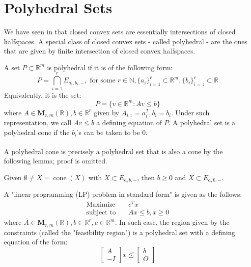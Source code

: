 \section{Polyhedral Sets}
\label{sect:017}

\paragraph{}We have seen in  that closed convex sets are essentially intersections of closed halfspaces. A special class of closed convex sets - called polyhedral - are the ones that are given by finite intersection of closed convex halfspaces.

\begin{defn}\label{defn:017-polyhedral-sets}
	A set $P\subset \mathbb{R}^m$ is polyhedral if it is of the following form:
	\[
		P=\bigcap_{i=1}^rE_{a_i,b_i,-},\text{ for some }r\in \mathbb{N},\{a_i\}_{i=1}^r\subset\mathbb{R}^m,\{b_i\}_{i=1}^r\subset\mathbb{R}
	\]
	Equivalently, it is the set:
	\[
		P=\{v\in \mathbb{R}^m:Av\leq b\}
	\]
	where $A\in \mathbf{M}_{r,m}(\mathbb{R}),b\in \mathbb{R}^r$ given by $A_{i,:}=a_i^T,b_i=b_i$. Under such representation, we call $Av\leq b$ a defining equation of $P$. A polyhedral set is a polyhedral cone if the $b_i$'s can be taken to be $0$.
\end{defn}

\paragraph{}A polyhedral cone is precisely a polyhedral set that is also a cone by the following lemma; proof is omitted.

\begin{lemm}\label{lemm:017-promotion}
	Given $\emptyset\neq X=\operatorname{cone}(X)$ with $X\subset E_{a,b,-}$, then $b\geq 0$ and $X\subset E_{a,0,-}$.
\end{lemm}

\begin{exmp}
	A "linear programming (LP) problem in standard form" is given as the follows:
	\begin{align*}
		\text{Maximize}\quad   & c^Tx              \\
		\text{subject to}\quad & Ax\leq b, x\geq 0
	\end{align*}
	where $A\in \mathbf{M}_{r,m}(\mathbb{R}),b\in \mathbb{R}^r,c\in \mathbb{R}^m$. In such case, the region given by the constraints (called the "feasibility region") is a polyhedral set with a defining equation of the form:
	\[
		\left[
			\begin{array}{r}
				A \\\hline
				-I
			\end{array}
			\right]
		x\leq
		\left[
			\begin{array}{r}
				b \\\hline
				O
			\end{array}
			\right]
	\]
\end{exmp}

